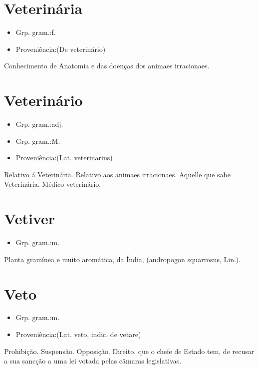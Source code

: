 \documentclass{article}
\begin{document}
\section{Veterinária}
\begin{itemize}
\item {Grp. gram.:f.}
\end{itemize}
\begin{itemize}
\item {Proveniência:(De \textunderscore veterinário\textunderscore )}
\end{itemize}
Conhecimento de Anatomia e das doenças dos animaes irracionaes.
\section{Veterinário}
\begin{itemize}
\item {Grp. gram.:adj.}
\end{itemize}
\begin{itemize}
\item {Grp. gram.:M.}
\end{itemize}
\begin{itemize}
\item {Proveniência:(Lat. \textunderscore veterinarius\textunderscore )}
\end{itemize}
Relativo á Veterinária.
Relativo aos animaes irracionaes.
Aquelle que sabe Veterinária.
Médico veterinário.
\section{Vetiver}
\begin{itemize}
\item {Grp. gram.:m.}
\end{itemize}
Planta gramínea e muito aromática, da Índia, (\textunderscore andropogon squarrosus\textunderscore , Lin.).
\section{Veto}
\begin{itemize}
\item {Grp. gram.:m.}
\end{itemize}
\begin{itemize}
\item {Proveniência:(Lat. \textunderscore veto\textunderscore , indic. de \textunderscore vetare\textunderscore )}
\end{itemize}
Prohibição.
Suspensão.
Opposição.
Direito, que o chefe de Estado tem, de recusar a sua sancção a uma lei votada pelas câmaras legislativas.
\end{document}
